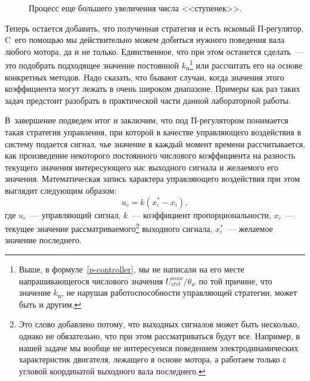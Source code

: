 \documentclass[12pt,a4paper,openany]{extarticle}
\begin{document}
\begin{figure}[h!]
\begin{minipage}[h]{0.47\linewidth}
	\end{minipage}
	\hfill
	\begin{minipage}[h]{0.47\linewidth}
	\end{minipage}
	\caption{Процесс еще большего увеличения числа <<ступенек>>.}
	\label{upstairs}
\end{figure}

Теперь остается добавить, что полученная стратегия и есть искомый П-регулятор.
C~его помощью мы действительно можем добиться нужного поведения вала любого мотора, да и не только.
Единственное, что при этом останется сделать~--- это подобрать подходящее значение постоянной $k_\textit{п}$\footnote{Выше, в формуле~\eqref{p-controller}, мы не написали на его месте напрашивающегося числового значения $U_{ctrl}^{max}\!/\theta_w$ по той причине, что значение $k_\textit{п}$, не нарушая работоспособности управляющей стратегии, может быть и другим.} или рассчитать его на основе конкретных методов.
Надо сказать, что бывают случаи, когда значения этого коэффициента могут лежать в очень широком диапазоне.
Примеры как раз таких задач предстоит разобрать в практической части данной лабораторной работы.

В~завершение подведем итог и заключим, что под П-регулятором понимается такая стратегия управления, при которой в качестве управляющего воздействия в систему подается сигнал, чье значение в каждый момент времени рассчитывается, как произведение некоторого постоянного числового коэффициента на разность текущего значения интересующего нас выходного сигнала и желаемого его значения.
Математическая запись характера управляющего воздействия при этом выглядит следующим образом:
\begin{equation}\label{main_p-contoller}
	u_{c} = k(x_i^*-x_i),
\end{equation}
где $u_c$~--- управляющий сигнал, $k$~--- коэффициент пропорциональности, $x_i$~--- текущее значение рассматриваемого\footnote{Это слово добавлено потому, что выходных сигналов может быть несколько, однако не обязательно, что при этом рассматриваться будут все.
Например, в нашей задаче мы вообще не интересуемся поведением электродинамических характеристик двигателя, лежащего в основе мотора, а работаем только с угловой координатой выходного вала последнего.} выходного сигнала, $x_i^*$~--- желаемое значение последнего.
\end{document}

